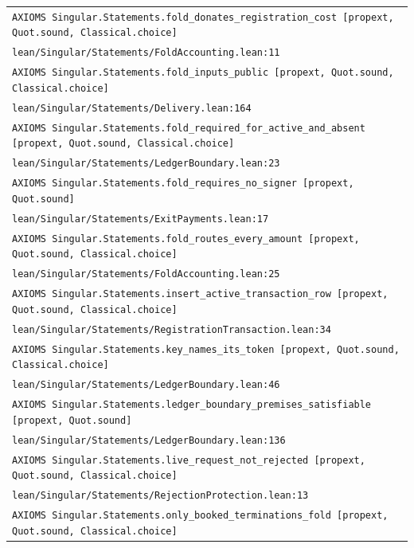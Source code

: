 \begin{longtable}{p{.94\linewidth}}
\texttt{AXIOMS }\nolinkurl{Singular.Statements.fold_donates_registration_cost}\texttt{ [propext, Quot.sound, Classical.choice]}\\
\nolinkurl{lean/Singular/Statements/FoldAccounting.lean:11}\\[5pt]
\texttt{AXIOMS }\nolinkurl{Singular.Statements.fold_inputs_public}\texttt{ [propext, Quot.sound, Classical.choice]}\\
\nolinkurl{lean/Singular/Statements/Delivery.lean:164}\\[5pt]
\texttt{AXIOMS }\nolinkurl{Singular.Statements.fold_required_for_active_and_absent}\texttt{ [propext, Quot.sound, Classical.choice]}\\
\nolinkurl{lean/Singular/Statements/LedgerBoundary.lean:23}\\[5pt]
\texttt{AXIOMS }\nolinkurl{Singular.Statements.fold_requires_no_signer}\texttt{ [propext, Quot.sound]}\\
\nolinkurl{lean/Singular/Statements/ExitPayments.lean:17}\\[5pt]
\texttt{AXIOMS }\nolinkurl{Singular.Statements.fold_routes_every_amount}\texttt{ [propext, Quot.sound, Classical.choice]}\\
\nolinkurl{lean/Singular/Statements/FoldAccounting.lean:25}\\[5pt]
\texttt{AXIOMS }\nolinkurl{Singular.Statements.insert_active_transaction_row}\texttt{ [propext, Quot.sound, Classical.choice]}\\
\nolinkurl{lean/Singular/Statements/RegistrationTransaction.lean:34}\\[5pt]
\texttt{AXIOMS }\nolinkurl{Singular.Statements.key_names_its_token}\texttt{ [propext, Quot.sound, Classical.choice]}\\
\nolinkurl{lean/Singular/Statements/LedgerBoundary.lean:46}\\[5pt]
\texttt{AXIOMS }\nolinkurl{Singular.Statements.ledger_boundary_premises_satisfiable}\texttt{ [propext, Quot.sound]}\\
\nolinkurl{lean/Singular/Statements/LedgerBoundary.lean:136}\\[5pt]
\texttt{AXIOMS }\nolinkurl{Singular.Statements.live_request_not_rejected}\texttt{ [propext, Quot.sound, Classical.choice]}\\
\nolinkurl{lean/Singular/Statements/RejectionProtection.lean:13}\\[5pt]
\texttt{AXIOMS }\nolinkurl{Singular.Statements.only_booked_terminations_fold}\texttt{ [propext, Quot.sound, Classical.choice]}\\

\end{longtable}

